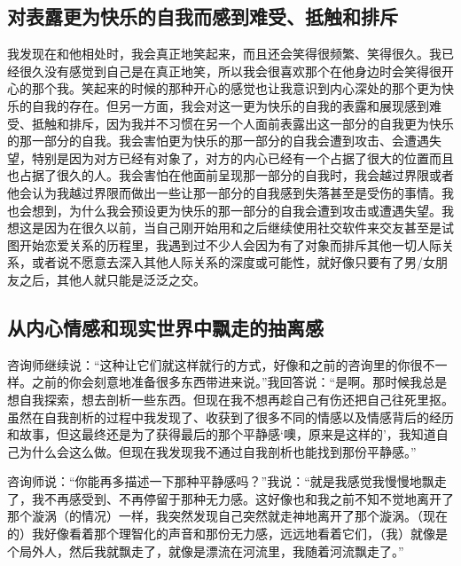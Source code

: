 

\subsection*{对表露更为快乐的自我而感到难受、抵触和排斥}

我发现在和他相处时，我会真正地笑起来，而且还会笑得很频繁、笑得很久。我已经很久没有感觉到自己是在真正地笑，所以我会很喜欢那个在他身边时会笑得很开心的那个我。笑起来的时候的那种开心的感觉也让我意识到内心深处的那个更为快乐的自我的存在。但另一方面，我会对这一更为快乐的自我的表露和展现感到难受、抵触和排斥，因为我并不习惯在另一个人面前表露出这一部分的自我\pozhehao{}更为快乐的那一部分的自我。我会害怕更为快乐的那一部分的自我会遭到攻击、会遭遇失望，特别是因为对方已经有对象了，对方的内心已经有一个占据了很大的位置而且也占据了很久的人。我会害怕在他面前呈现那一部分的自我时，我会越过界限或者他会认为我越过界限而做出一些让那一部分的自我感到失落甚至是受伤的事情。我也会想到，为什么我会预设更为快乐的那一部分的自我会遭到攻击或遭遇失望。我想这是因为在很久以前，当自己刚开始用和之后继续使用社交软件来交友甚至是试图开始恋爱关系的历程里，我遇到过不少人会因为有了对象而排斥其他一切人际关系，或者说不愿意去深入其他人际关系的深度或可能性，就好像只要有了男/女朋友之后，其他人就只能是泛泛之交。



\subsection*{从内心情感和现实世界中飘走的抽离感}

咨询师继续说：“这种让它们就这样就行的方式，好像和之前的咨询里的你很不一样。之前的你会刻意地准备很多东西带进来说。”我回答说：“是啊。那时候我总是想自我探索，想去剖析一些东西。但现在我不想再趁自己有伤还把自己往死里抠。虽然在自我剖析的过程中我发现了、收获到了很多不同的情感以及情感背后的经历和故事，但这最终还是为了获得最后的那个平静感\pozhehao{}‘噢，原来是这样的’，我知道自己为什么会这么做。但现在我发现我不通过自我剖析也能找到那份平静感。”

咨询师说：“你能再多描述一下那种平静感吗？”我说：“就是我感觉我慢慢地飘走了，我不再感受到、不再停留于那种无力感。这好像也和我之前不知不觉地离开了那个漩涡（的情况）一样，我突然发现自己突然就走神地离开了那个漩涡。（现在的）我好像看着那个理智化的声音和那份无力感，远远地看着它们，（我）就像是个局外人，然后我就飘走了，就像是漂流在河流里，我随着河流飘走了。”

